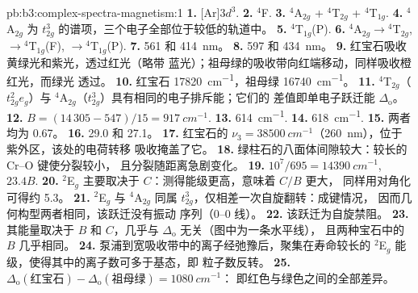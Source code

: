\begin{solution}{pb:b3:complex-spectra-magnetism:1}
\textbf{1.} [Ar]$3d^3$.
\textbf{2.} $^4$F.
\textbf{3.} $^4$A$_{2g}$ + $^4$T$_{2g}$ + $^4$T$_{1g}$.
\textbf{4.} $^4$A$_{2g}$ 为 $t_{2g}^3$ 的谱项，三个电子全部位于较低的轨道中。
\textbf{5.} $^4$T$_{1g}$(P).
\textbf{6.} $^4$A$_{2g}\to{}^4$T$_{2g}$, $\to{}^4$T$_{1g}$(F), $\to{}^4$T$_{1g}$(P).
\textbf{7.} 561 和 \qty{414}{nm}。
\textbf{8.} 597 和 \qty{434}{nm}。
\textbf{9.} 红宝石吸收黄绿光和紫光，透过红光（略带
蓝光）；祖母绿的吸收带向红端移动，同样吸收橙红光，而绿光
透过。
\textbf{10.} 红宝石 \qty{17820}{cm^{-1}}，祖母绿 \qty{16740}{cm^{-1}}。
\textbf{11.} $^4$T$_{2g}$（$t_{2g}^2e_g$）与 $^4$A$_{2g}$（$t_{2g}^3$）具有相同的电子排斥能；它们的
差值即单电子跃迁能 $\Delta_{\mathrm o}$。
\textbf{12.} $B = (14\,305 - 547)/15 = \qty{917}{cm^{-1}}$.
\textbf{13.} \qty{614}{cm^{-1}}.
\textbf{14.} \qty{618}{cm^{-1}}.
\textbf{15.} 两者均为 0.67。
\textbf{16.} 29.0 和 27.1。
\textbf{17.} 红宝石的 $\nu_3 = \qty{38500}{cm^{-1}}$（\qty{260}{nm}），位于紫外区，该处的电荷转移
吸收掩盖了它。
\textbf{18.} 绿柱石的八面体间隙较大：较长的 Cr--O 键使分裂较小，
且分裂随距离急剧变化。
\textbf{19.} $10^7/695 = \qty{14390}{cm^{-1}}$, $23.4B$.
\textbf{20.} $^2$E$_g$ 主要取决于 $C$：测得能级更高，意味着 $C/B$ 更大，
同样用对角化可得约 5.3。
\textbf{21.} $^2$E$_g$ 与 $^4$A$_{2g}$ 同属 $t_{2g}^3$，仅相差一次自旋翻转：成键情况，
因而几何构型两者相同，该跃迁没有振动
序列（0--0 线）。
\textbf{22.} 该跃迁为自旋禁阻。
\textbf{23.} 其能量取决于 $B$ 和 $C$，几乎与 $\Delta_{\mathrm o}$ 无关（图中为一条水平线），
且两种宝石中的 $B$ 几乎相同。
\textbf{24.} 泵浦到宽吸收带中的离子经弛豫后，聚集在寿命较长的
$^2$E$_g$ 能级，使得其中的离子数可多于基态，即
粒子数反转。
\textbf{25.} \textbf{$\Delta_{\mathrm o}(\text{红宝石}) - \Delta_{\mathrm o}(\text{祖母绿}) = \qty{1080}{cm^{-1}}$}：
即红色与绿色之间的全部差异。
\end{solution}
